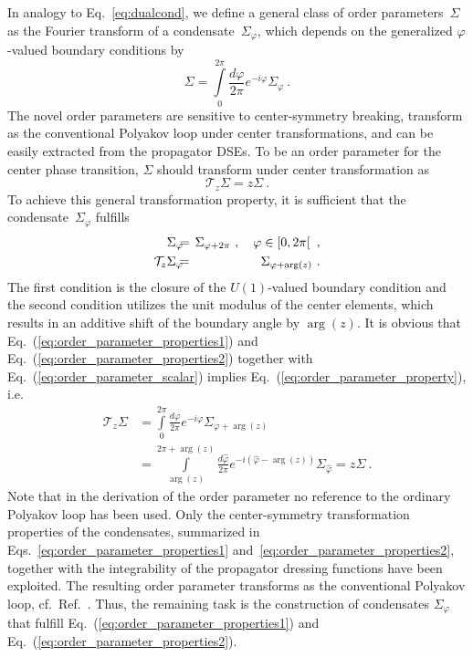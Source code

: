 \documentclass[final,twocolumn,merge,sort&compress]{elsarticle}
\def\Eq#1{Eq.~(\ref{#1})}
\begin{document}
In analogy to Eq.~\eqref{eq:dualcond}, we define a general class of
order parameters~$\Sigma$ as the Fourier transform of a
condensate~$\Sigma_\varphi$, which depends on the generalized
$\varphi$-valued boundary conditions by
\begin{equation}
\label{eq:order_parameter_scalar}
 \Sigma = \int\limits_{0}^{2\pi}\frac{d\varphi}{2\pi}e^{-i\varphi} \Sigma_\varphi \ .
\end{equation}
The novel order parameters are sensitive to center-symmetry breaking,
transform as the conventional Polyakov loop under center
transformations, and can be easily extracted from the propagator DSEs.
To be an order parameter for the center phase transition, $\Sigma$
should transform under center transformation as
\begin{equation}
\label{eq:order_parameter_property}
\mathcal T_z \Sigma = z \Sigma\ .
\end{equation}
To achieve this general transformation property, it is sufficient that
the condensate~$\Sigma_\varphi$ fulfills
\begin{eqnarray}
  \Sigma_\varphi \hspace{-0.2cm} & = & \hspace{-0.2cm} \Sigma_{\varphi+2\pi} \ , \quad \varphi\in\left[0,2\pi\right[ \ , \label{eq:order_parameter_properties1} \\ 
  \mathcal T_z\Sigma_\varphi \hspace{-0.2cm} & = & \hspace{-0.2cm} \Sigma_{\varphi+\arg(z)} \ . \label{eq:order_parameter_properties2}
\end{eqnarray}
The first condition is the closure of the $U(1)$-valued boundary
condition and the second condition utilizes the unit modulus of the
center elements, which results in an additive shift of the boundary
angle by $\arg(z)$. It is obvious that
\Eq{eq:order_parameter_properties1} and
\Eq{eq:order_parameter_properties2} together with
\Eq{eq:order_parameter_scalar} implies
\Eq{eq:order_parameter_property}, i.e.\
\begin{equation}
\begin{split}\label{eq:order_parameter_proof}
  \mathcal T_z \Sigma & = \int\limits_{0}^{2\pi} \frac{d\varphi}{2\pi}
  e^{-i\varphi} \Sigma_{\varphi+\arg(z)} \\
  & = \int\limits_{\arg(z)}^{2\pi+\arg(z)} \frac{d\hat{\varphi}}{2\pi}
  e^{-i(\hat{\varphi}-\arg(z))} \Sigma_{\hat{\varphi}} = z \Sigma\ .
\end{split}
\end{equation}
Note that in the derivation of the order parameter no reference to the
ordinary Polyakov loop has been used.  Only the center-symmetry
transformation properties of the condensates, summarized in
Eqs.~\eqref{eq:order_parameter_properties1}
and~\eqref{eq:order_parameter_properties2}, together with the
integrability of the propagator dressing functions have been
exploited. The resulting order parameter transforms as the
conventional Polyakov loop, cf.~Ref.~\cite{Gattringer:2006ci}.  Thus,
the remaining task is the construction of condensates $\Sigma_\varphi$
that fulfill \Eq{eq:order_parameter_properties1} and
\Eq{eq:order_parameter_properties2}.
\end{document}
